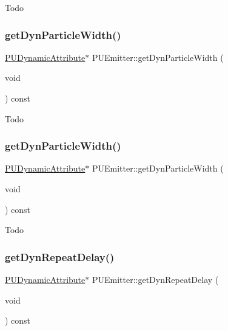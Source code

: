 Todo \mbox{\label{classPUEmitter_a88dbac81e6621814124727767a79434f}} 
\subsubsection{\texorpdfstring{get\+Dyn\+Particle\+Width()}{getDynParticleWidth()}\hspace{0.1cm}{\footnotesize\ttfamily [1/2]}}
{\footnotesize\ttfamily \hyperlink{classPUDynamicAttribute}{P\+U\+Dynamic\+Attribute}$\ast$ P\+U\+Emitter\+::get\+Dyn\+Particle\+Width (\begin{DoxyParamCaption}\item[{void}]{ }\end{DoxyParamCaption}) const\hspace{0.3cm}{\ttfamily [inline]}}

Todo \mbox{\label{classPUEmitter_a0ec28ae4cf2f12af44f7dbb7a52a1e69}} 
\subsubsection{\texorpdfstring{get\+Dyn\+Particle\+Width()}{getDynParticleWidth()}\hspace{0.1cm}{\footnotesize\ttfamily [2/2]}}
{\footnotesize\ttfamily \hyperlink{classPUDynamicAttribute}{P\+U\+Dynamic\+Attribute}$\ast$ P\+U\+Emitter\+::get\+Dyn\+Particle\+Width (\begin{DoxyParamCaption}\item[{void}]{ }\end{DoxyParamCaption}) const\hspace{0.3cm}{\ttfamily [inline]}}

Todo \mbox{\label{classPUEmitter_a72ef4ad6d5eedc9508b554c76d7870d7}} 
\subsubsection{\texorpdfstring{get\+Dyn\+Repeat\+Delay()}{getDynRepeatDelay()}\hspace{0.1cm}{\footnotesize\ttfamily [1/2]}}
{\footnotesize\ttfamily \hyperlink{classPUDynamicAttribute}{P\+U\+Dynamic\+Attribute}$\ast$ P\+U\+Emitter\+::get\+Dyn\+Repeat\+Delay (\begin{DoxyParamCaption}\item[{void}]{ }\end{DoxyParamCaption}) const\hspace{0.3cm}{\ttfamily [inline]}}

